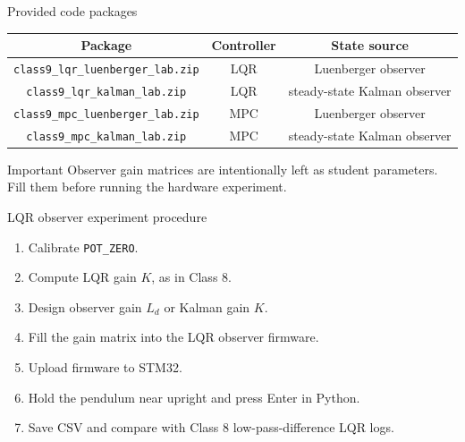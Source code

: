 \documentclass[aspectratio=169]{beamer}
\begin{document}
\begin{frame}{Provided code packages}
\begin{center}
\begin{tabular}{c|c|c}
\hline
Package & Controller & State source \\
\hline
\texttt{class9\_lqr\_luenberger\_lab.zip} & LQR & Luenberger observer \\
\texttt{class9\_lqr\_kalman\_lab.zip} & LQR & steady-state Kalman observer \\
\texttt{class9\_mpc\_luenberger\_lab.zip} & MPC & Luenberger observer \\
\texttt{class9\_mpc\_kalman\_lab.zip} & MPC & steady-state Kalman observer \\
\hline
\end{tabular}
\end{center}

\vspace{0.25cm}
\begin{alertblock}{Important}
\small
Observer gain matrices are intentionally left as student parameters. Fill them before running the hardware experiment.
\end{alertblock}
\end{frame}

\begin{frame}{LQR observer experiment procedure}
\begin{enumerate}
    \item Calibrate \texttt{POT\_ZERO}.
    \vspace{0.18cm}
    \item Compute LQR gain \(K\), as in Class 8.
    \vspace{0.18cm}
    \item Design observer gain \(L_d\) or Kalman gain \(K\).
    \vspace{0.18cm}
    \item Fill the gain matrix into the LQR observer firmware.
    \vspace{0.18cm}
    \item Upload firmware to STM32.
    \vspace{0.18cm}
    \item Hold the pendulum near upright and press Enter in Python.
    \vspace{0.18cm}
    \item Save CSV and compare with Class 8 low-pass-difference LQR logs.
\end{enumerate}
\end{frame}
\end{document}
